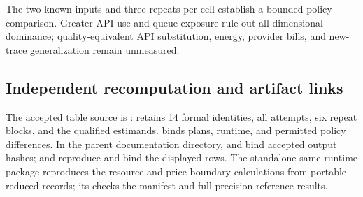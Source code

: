 The two known inputs and three repeats per cell establish a bounded policy
comparison. Greater API use and queue exposure rule out all-dimensional
dominance; quality-equivalent API substitution, energy, provider bills, and
new-trace generalization remain unmeasured.

\subsection{Independent recomputation and artifact links}
The accepted table source is
:
 retains 14 formal identities, 
all attempts,  six repeat blocks, and 
the qualified estimands.  binds plans, runtime,
and permitted policy differences. In the parent documentation directory,
 and  bind accepted output hashes;
 and  reproduce
and bind the displayed rows. The standalone same-runtime package reproduces the resource
and price-boundary calculations from portable reduced records; its
 checks the manifest and full-precision reference results.
